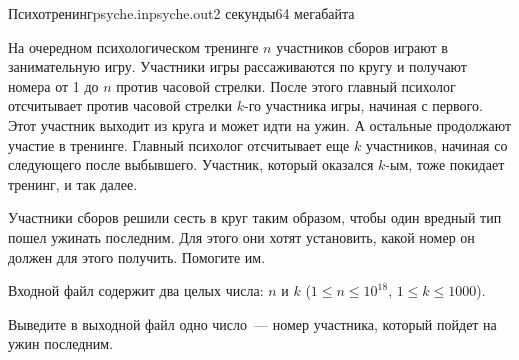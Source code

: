 
\begin{problem}{Психотренинг}{psyche.in}{psyche.out}{2 секунды}{64 мегабайта}

На очередном психологическом тренинге $n$ участников сборов играют в 
занимательную игру. Участники игры рассаживаются по кругу и получают
номера от 1 до $n$ против часовой стрелки. После этого главный 
психолог отсчитывает против часовой стрелки $k$-го участника игры, 
начиная с первого. Этот участник выходит из круга и может идти
на ужин. А остальные продолжают участие в тренинге. Главный психолог
отсчитывает еще $k$ участников, начиная со следующего после выбывшего.
Участник, который оказался $k$-ым, тоже покидает тренинг, и так далее.

Участники сборов решили сесть в круг таким образом, чтобы один
вредный тип пошел ужинать последним. Для этого они хотят установить,
какой номер он должен для этого получить. Помогите им.

\InputFile

Входной файл содержит два целых числа: $n$ и $k$ ($1 \le n \le 10^{18}$,
$1 \le k \le 1000$).


\OutputFile

Выведите в выходной файл одно число~--- номер участника, который
пойдет на ужин последним.

\Example

\begin{example}
%
\end{example}

\end{problem}
                                          